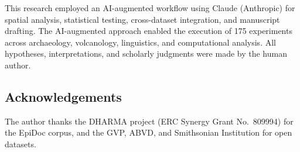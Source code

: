 \documentclass[12pt]{article}
\begin{document}
This research employed an AI-augmented workflow using Claude (Anthropic) for spatial analysis, statistical testing, cross-dataset integration, and manuscript drafting.
The AI-augmented approach enabled the execution of 175 experiments across archaeology, volcanology, linguistics, and computational analysis.
All hypotheses, interpretations, and scholarly judgments were made by the human author.

\subsection*{Acknowledgements}

The author thanks the DHARMA project (ERC Synergy Grant No.\ 809994) for the EpiDoc corpus, and the GVP, ABVD, and Smithsonian Institution for open datasets.


\end{document}
